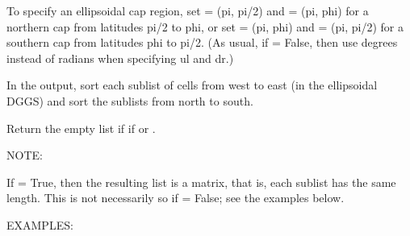 \documentclass[a4paper,12ptopenany,oneside,english]{sphinxmanual}
\begin{document}
\begin{fulllineitems}
\begin{fulllineitems}
\sphinxAtStartPar
To specify an ellipsoidal cap region, set  = (\sphinxhyphen{}pi, pi/2) and
 = (\sphinxhyphen{}pi, phi) for a northern cap from latitudes pi/2 to phi, or
set  = (\sphinxhyphen{}pi, phi) and  = (\sphinxhyphen{}pi, \sphinxhyphen{}pi/2) for a southern cap from
latitudes phi to \sphinxhyphen{}pi/2. (As usual, if  = False,
then use degrees instead of radians when specifying ul and dr.)

\sphinxAtStartPar
In the output, sort each sublist of cells from west to east (in the
ellipsoidal DGGS) and sort the sublists from north to south.

\sphinxAtStartPar
Return the empty list if if  or .

\sphinxAtStartPar
NOTE:

\sphinxAtStartPar
If  = True, then the resulting list is a matrix, that is,
each sublist has the same length.  This is not necessarily so if
 = False; see the examples below.

\sphinxAtStartPar
EXAMPLES:

\begin{sphinxVerbatim}[commandchars=\\\{\}]
  
  
   
     
    
   
    \PYG{p}{[}    \PYG{p}{]}


\end{sphinxVerbatim}
\end{fulllineitems}
\end{fulllineitems}
\end{document}
